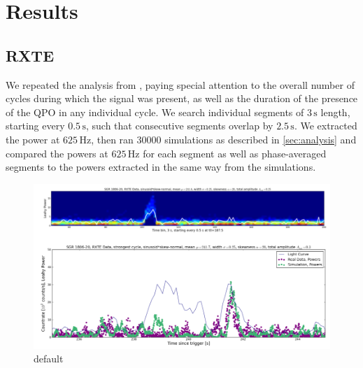 \documentclass{emulateapj}
\begin{document}
\section{Results}
\label{sec:results}

\subsection{RXTE}
\label{sec:rxte_results}

We repeated the analysis from \citealt{Strohmayer06}, paying special attention to the overall number of cycles during which the signal was present, as well as the duration of the presence of the QPO in any individual cycle.
We search individual segments of $3 \, \mathrm{s}$ length, starting every $0.5 \, \mathrm{s}$, such that consecutive segments overlap by $2.5 \, \mathrm{s}$. We extracted the power at $625 \, \mathrm{Hz}$, then ran 30000 simulations as described in \ref{sec:analysis} and compared the powers at $625 \, \mathrm{Hz}$ for each segment as well as phase-averaged segments to the powers extracted in the same way from the simulations.

\begin{figure}[htbp]
\begin{center}
\includegraphics[width=\textwidth]{1806_rxte_lc_combined.png}
\caption{default}
\label{default}
\end{center}
\end{figure}
\end{document}
